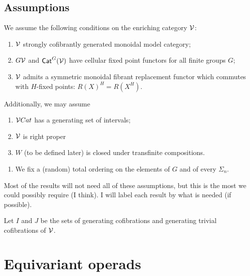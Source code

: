 \documentclass[psamsfonts,onesided,10pt,letterpaper]{amsart}%
\renewcommand{\F}{\mathcal F}
\renewcommand{\1}{\ensuremath{\mathbb{id}}}
\begin{document}
\subsection{Assumptions}

We assume the following conditions on the enriching category $\mathcal V$:

\begin{enumerate}
\item $\mathcal V$ strongly cofibrantly generated monoidal model category;
\item $G\mathcal V$ and $\mathsf{Cat}^G(\mathcal V)$ have cellular fixed point functors for all finite groups $G$;
\item $\mathcal V$ admits a symmetric monoidal fibrant replacement functor which commutes with $H$-fixed points: $R(X)^H = R(X^H)$. 
\end{enumerate}

Additionally, we may assume
\begin{enumerate}
\item $\mathcal V Cat$ has a generating set of intervals;
\item $\mathcal V$ is right proper
\item $W$ (to be defined later) is closed under transfinite compositions.
\end{enumerate}

\begin{enumerate}
\item We fix a (random) total ordering on the elements of $G$ and of every $\Sigma_n$.
\end{enumerate}

Most of the results will not need all of these assumptions, but this is the most we could possibly require (I think). I will label each result by what is needed (if possible).

Let $I$ and $J$ be the sets of generating cofibrations and generating trivial cofibrations of $\mathcal V$.


\newpage
\section{Equivariant operads}
\end{document}
